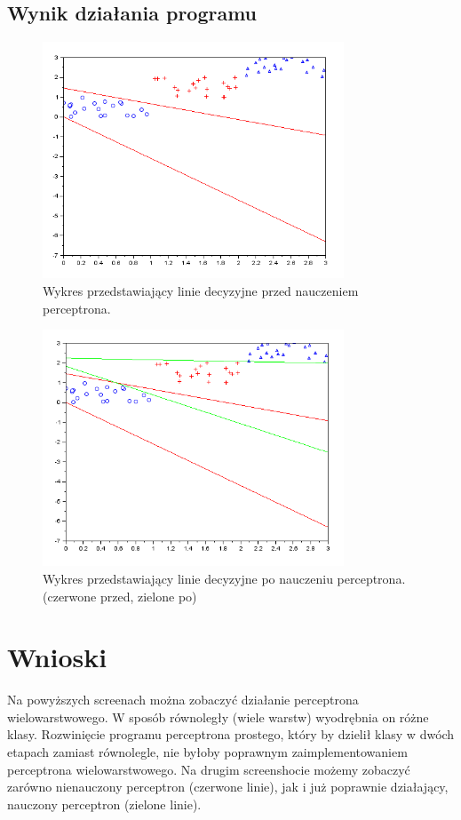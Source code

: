 \documentclass{article}
\begin{document}
\subsection{Wynik działania programu}

\begin{figure}[H]
  \centering
  \includegraphics[width=0.8\textwidth]{data/unlearned.png}
 \caption{Wykres przedstawiający linie decyzyjne przed nauczeniem perceptrona.}
\end{figure}

\begin{figure}[H]
  \centering
  \includegraphics[width=0.8\textwidth]{data/learned.png}
 \caption{Wykres przedstawiający linie decyzyjne po nauczeniu perceptrona. (czerwone przed, zielone po)}
\end{figure}

\section{Wnioski}


Na powyższych screenach można zobaczyć działanie perceptrona wielowarstwowego. W sposób równoległy (wiele warstw) wyodrębnia on różne klasy. Rozwinięcie programu perceptrona prostego, który by dzielił klasy w dwóch etapach zamiast równolegle, nie byłoby poprawnym zaimplementowaniem perceptrona wielowarstwowego. Na drugim screenshocie możemy zobaczyć zarówno nienauczony perceptron (czerwone linie), jak i już poprawnie działający, nauczony perceptron (zielone linie).
\end{document}
